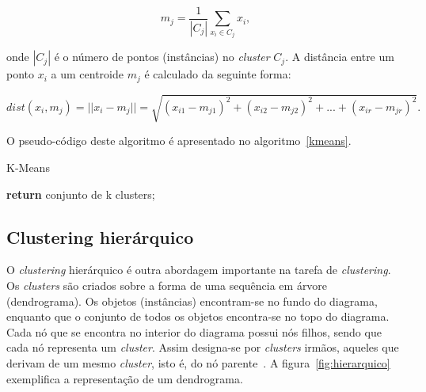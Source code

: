 \begin{equation}
m_{j} =  \frac{1}{|C_{j}|} \sum_{x_{i} \in C_{j} }x_{i} ,
\end{equation}

onde $ |C_{j}| $ é o número de pontos (instâncias) no \textit{cluster} $ C_{j} $. A distância entre um ponto $ x_{i} $ a um centroide $ m_{j} $ é calculado da seguinte forma:

\begin{equation}
dist(x_{i}, m_{j}) = ||x_{i} - m_{j}|| =  \sqrt{(x_{i1} - m_{j1})^2 + (x_{i2} - m_{j2})^2 + ... + (x_{ir} - m_{jr})^2} .
\end{equation}

O pseudo-código deste algoritmo é apresentado no algoritmo~\ref{kmeans}.

\begin{algorithm}
\caption{K-Means}\label{kmeans}
\begin{algorithmic}[1]
	\Repeat 
	\State \textbf{return} {conjunto de k clusters;}
\EndProcedure 
\end{algorithmic}
\end{algorithm}


\subsection{Clustering hierárquico} \label{subsec:hierar}

O \textit{clustering} hierárquico é outra abordagem importante na tarefa de \textit{clustering}. Os \textit{clusters} são criados sobre a forma de uma sequência em árvore (dendrograma). Os objetos (instâncias) encontram-se no fundo do diagrama, enquanto que o conjunto de todos os objetos encontra-se no topo do diagrama. Cada nó que se encontra no interior do diagrama possui nós filhos, sendo que cada nó representa um \textit{cluster}. Assim designa-se por \textit{clusters} irmãos, aqueles que derivam de um mesmo \textit{cluster}, isto é, do nó parente~\citet{Liu2011}. A figura~\ref{fig:hierarquico} exemplifica a representação de um dendrograma. 


